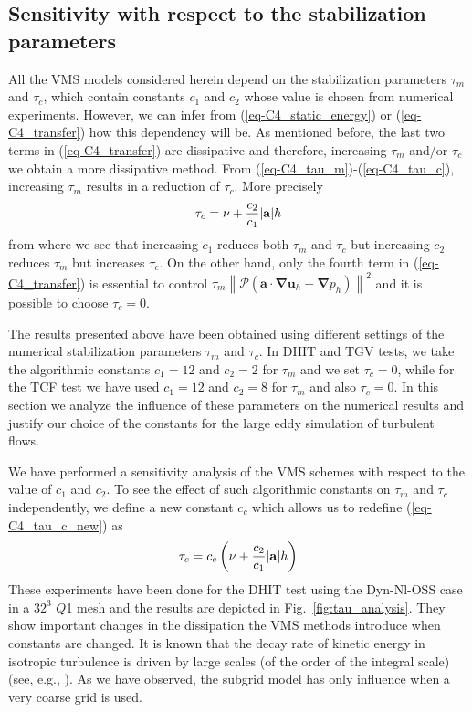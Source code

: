 \subsection{Sensitivity with respect to the stabilization parameters}
\label{subsec-C4_effect_const}

All the VMS models considered herein depend on the stabilization parameters $\tau_m$ and $\tau_c$, which contain constants $c_1$ and $c_2$ whose value is chosen from numerical experiments. However, we can infer from (\ref{eq-C4_static_energy}) or (\ref{eq-C4_transfer}) how this dependency will be. As mentioned before, the last two terms in (\ref{eq-C4_transfer}) are dissipative and therefore, increasing $\tau_m$ and/or $\tau_c$ we obtain a more dissipative method. From (\ref{eq-C4_tau_m})-(\ref{eq-C4_tau_c}), increasing $\tau_m$ results in a reduction of $\tau_c$. More precisely 
\begin{equation}
\label{eq-C4_tau_c_new}
\tau_c=\nu + \frac{c_2}{c_1}{|{\bf a}|}{h}
\end{equation}
from where we see that increasing $c_1$ reduces both $\tau_m$ and $\tau_c$ but increasing $c_2$ reduces $\tau_m$ but increases $\tau_c$. On the other hand, only the fourth term in (\ref{eq-C4_transfer}) is essential to control
$ \tau_{m} \left\| \mathcal{P} \left( \mathbf{a}\cdot \mathbf{\nabla u}_{h}+\mathbf{\nabla }p_{h}\right) \right\|^{2} $ and it is possible to choose $\tau_c=0$. 

The results presented above have been obtained using different settings of the numerical stabilization parameters $\tau_m$ and $\tau_c$. In DHIT and TGV tests, we take the algorithmic constants $c_1=12$ and $c_2=2$ for $\tau_m$ and we set $\tau_c=0$, while for the TCF test we have used $c_1=12$ and $c_2=8$ for $\tau_m$ and also $\tau_c=0$. In this section we analyze the influence of these parameters on the numerical results and justify our choice of the constants for the large eddy simulation of turbulent flows.

We have performed a sensitivity analysis of the VMS schemes with respect to the value of $c_1$ and $c_2$. To see the effect of such algorithmic constants on $\tau_m$ and $\tau_c$ independently, we define a new constant $c_c$ which allows us to redefine (\ref{eq-C4_tau_c_new}) as
\begin{equation}
\label{eq-C4_tau_c_cc_new}
\tau_c=c_c\left(\nu + \frac{c_2}{c_1}{|{\bf a}|}{h}\right)
\end{equation}
These experiments have been done for the DHIT test using the Dyn-Nl-OSS case in a $32^3$ $Q$1 mesh and the results are depicted in Fig.~\ref{fig:tau_analysis}. They show important changes in the dissipation the VMS methods introduce when constants are changed. %
It is known that the decay rate of kinetic energy in isotropic turbulence is driven by large scales (of the order of the integral scale) (see, e.g., \cite{comte-bellot_simple_1971}). As we have observed, the subgrid model has only influence when a very coarse grid is used.

